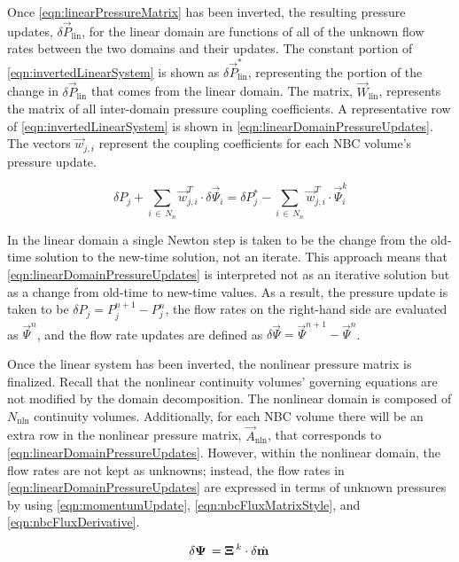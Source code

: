 Once \eqref{eqn:linearPressureMatrix} has been inverted, the resulting pressure updates, $\delta \vec{P}_{\text{lin}}$, for the linear domain are functions of all of the unknown flow rates between the two domains and their updates.
The constant portion of \eqref{eqn:invertedLinearSystem} is shown as $\delta \vec{P}_{\text{lin}}^{*}$, representing the portion of the change in $\delta \vec{P}_{\text{lin}}$ that comes from the linear domain.
The matrix, $\vec{W}_{\text{lin}}$, represents the matrix of all inter-domain pressure coupling coefficients.
A representative row of \eqref{eqn:invertedLinearSystem} is shown in \eqref{eqn:linearDomainPressureUpdates}.
The vectors $\vec{w}_{j, i}$ represent the coupling coefficients for each NBC volume's pressure update.

\begin{equation}
\label{eqn:linearDomainPressureUpdates}
\delta P_{j} + \sum_{i\, \in \, N_{n}} \vec{w}^{T}_{j, i} \cdot \delta \vec{\Psi}_{i} = \delta P_{j}^{*} - \sum_{i\, \in \, N_{n}} \vec{w}^{T}_{j, i} \cdot{} \vec{\Psi}^{k}_{i}
\end{equation}

In the linear domain a single Newton step is taken to be the change from the old-time solution to the new-time solution, not an iterate.
This approach means that \eqref{eqn:linearDomainPressureUpdates} is interpreted not as an iterative solution but as a change from old-time to new-time values.
As a result, the pressure update is taken to be $\delta P_{j} = P_{j}^{n+1} - P_{j}^{n}$, the flow rates on the right-hand side are evaluated as $\vec{\Psi}^{n}$, and the flow rate updates are defined as $\delta \vec{\Psi} = \vec{\Psi}^{n+1} - \vec{\Psi}^{n}$.

Once the linear system has been inverted, the nonlinear pressure matrix is finalized.
Recall that the nonlinear continuity volumes' governing equations are not modified by the domain decomposition.
The nonlinear domain is composed of $N_{\text{nln}}$ continuity volumes.
Additionally, for each NBC volume there will be an extra row in the nonlinear pressure matrix, $\vec{A}_{\text{nln}}$, that corresponds to \eqref{eqn:linearDomainPressureUpdates}.
However, within the nonlinear domain, the flow rates are not kept as unknowns; instead, the flow rates in \eqref{eqn:linearDomainPressureUpdates} are expressed in terms of unknown pressures by using \eqref{eqn:momentumUpdate}, \eqref{eqn:nbcFluxMatrixStyle}, and \eqref{eqn:nbcFluxDerivative}.

\begin{equation}
\label{eqn:nbcFluxDerivative}
\delta \vec{\Psi} = \vec{\Xi}^{k} \cdot \delta \momVec{}
\end{equation}

